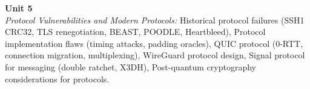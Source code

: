 \vspace{0.3cm}

\noindent\textbf{Unit 5} \\
\textit{Protocol Vulnerabilities and Modern Protocols:} Historical protocol failures (SSH1 CRC32, TLS renegotiation, BEAST, POODLE, Heartbleed), Protocol implementation flaws (timing attacks, padding oracles), QUIC protocol (0-RTT, connection migration, multiplexing), WireGuard protocol design, Signal protocol for messaging (double ratchet, X3DH), Post-quantum cryptography considerations for protocols.

\newpage
{}
